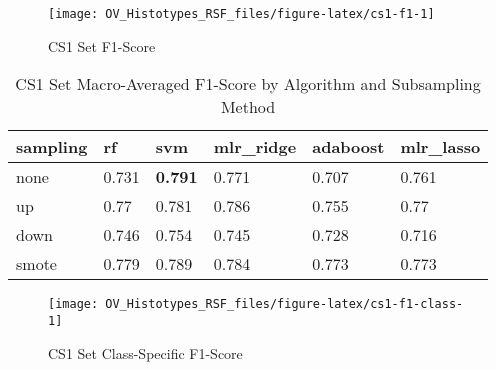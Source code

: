 \documentclass[
]{report}
\begin{document}
\begin{figure}[H]

{\centering \texttt{[image: OV\_Histotypes\_RSF\_files/figure-latex/cs1-f1-1]} 

}

\caption{CS1 Set F1-Score}\label{fig:cs1-f1}
\end{figure}

\begin{table}

\caption{\label{tab:cs1-f1-table}CS1 Set Macro-Averaged F1-Score by Algorithm and Subsampling Method}
\centering
\begin{tabular}[t]{l|l|l|l|l|l}
\hline
sampling & rf & svm & mlr\_ridge & adaboost & mlr\_lasso\\
\hline
none & 0.731 & \textbf{0.791} & 0.771 & 0.707 & 0.761\\
\hline
up & 0.77 & 0.781 & 0.786 & 0.755 & 0.77\\
\hline
down & 0.746 & 0.754 & 0.745 & 0.728 & 0.716\\
\hline
smote & 0.779 & 0.789 & 0.784 & 0.773 & 0.773\\
\hline
\end{tabular}
\end{table}

\begin{figure}[H]

{\centering \texttt{[image: OV\_Histotypes\_RSF\_files/figure-latex/cs1-f1-class-1]} 

}

\caption{CS1 Set Class-Specific F1-Score}\label{fig:cs1-f1-class}
\end{figure}
\end{document}
